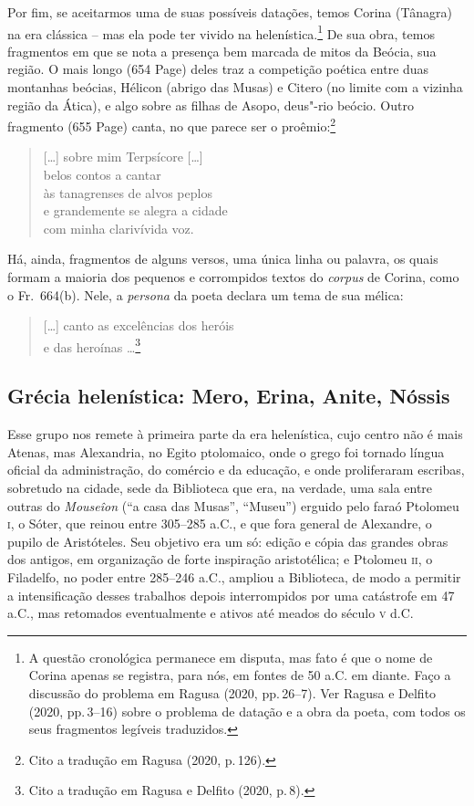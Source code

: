 Por fim, se aceitarmos uma de suas possíveis datações, temos Corina (Tânagra) na
era clássica -- mas ela pode ter vivido na helenística.\footnote{A questão cronológica permanece em disputa, mas fato é que o nome de Corina apenas se registra, para nós, em
fontes de 50 a.C. em diante. Faço a discussão do problema em Ragusa (2020, pp.\,26--7). Ver Ragusa e Delfito (2020, pp.\,3--16) sobre o problema de datação e a obra da poeta, com todos os seus fragmentos legíveis traduzidos.} De sua obra, temos
fragmentos em que se nota a presença bem marcada de mitos da Beócia, sua região.
O mais longo (654 Page) deles traz a competição poética entre duas montanhas beócias,
Hélicon (abrigo das Musas) e Citero (no limite com a vizinha região da Ática),
e algo sobre as filhas de Asopo, deus"-rio beócio. Outro fragmento (655 Page)
canta, no que parece ser o proêmio:\footnote{Cito a tradução em Ragusa (2020, p.\,126).}

\begin{quote}
\mbox[\ldots{}] sobre mim Terpsícore [\ldots{}]\\
belos contos a cantar\\
às tanagrenses de alvos peplos\\
e grandemente se alegra a cidade\\
com minha clarivívida voz.
\end{quote}

Há, ainda, fragmentos de alguns versos, uma única linha ou palavra, os quais
formam a maioria dos pequenos e corrompidos textos do \textit{corpus} de
Corina, como o Fr.~664(b). Nele, a \textit{persona} da poeta declara um
tema de sua mélica:

\begin{quote}
\mbox[\ldots{}] canto as excelências dos heróis\\
e das heroínas \ldots{}\footnote{Cito a tradução em Ragusa e Delfito (2020, p.\,8).}
\end{quote}

\smallskip

\subsection*{Grécia helenística: Mero, Erina, Anite, Nóssis}

\smallskip

Esse grupo nos remete à primeira parte da era helenística, cujo centro não é
mais Atenas, mas Alexandria, no Egito ptolomaico, onde o grego foi tornado
língua oficial da administração, do comércio e da educação, e onde proliferaram
escribas, sobretudo na cidade, sede da Biblioteca que era, na
verdade, uma sala entre outras do \textit{Mouseîon} (“a casa das Musas”,
“Museu”) erguido pelo faraó Ptolomeu \textsc{i}, o Sóter, que reinou entre 305--285 a.C.,
e que fora general de Alexandre, o pupilo de Aristóteles. Seu objetivo era um
só: edição e cópia das grandes obras dos antigos, em organização de forte
inspiração aristotélica; e Ptolomeu \textsc{ii}, o Filadelfo, no poder entre 285--246
a.C., ampliou a Biblioteca, de modo a permitir a intensificação desses
trabalhos depois interrompidos por uma catástrofe em 47 a.C., mas retomados
eventualmente e ativos até meados do século \textsc{v} d.C. 

